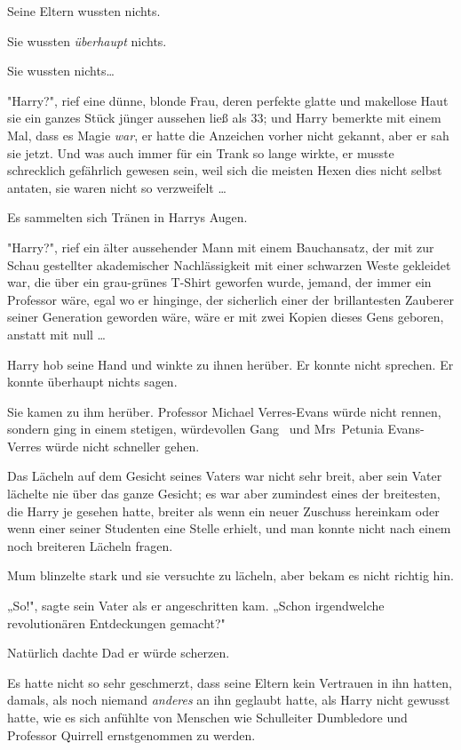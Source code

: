 {Seine Eltern wussten nichts.

Sie wussten \emph{überhaupt} nichts.

Sie wussten nichts…

"Harry?", rief eine dünne, blonde Frau, deren perfekte glatte und makellose Haut sie ein ganzes Stück jünger aussehen ließ als 33; und Harry bemerkte mit einem Mal, dass es Magie \emph{war}, er hatte die Anzeichen vorher nicht gekannt, aber er sah sie jetzt. Und was auch immer für ein Trank so lange wirkte, er musste schrecklich gefährlich gewesen sein, weil sich die meisten Hexen dies nicht selbst antaten, sie waren nicht so verzweifelt …

Es sammelten sich Tränen in Harrys Augen.

"Harry?", rief ein älter aussehender Mann mit einem Bauchansatz, der mit zur Schau gestellter akademischer Nachlässigkeit mit einer schwarzen Weste gekleidet war, die über ein grau-grünes T-Shirt geworfen wurde, jemand, der immer ein Professor wäre, egal wo er hinginge, der sicherlich einer der brillantesten Zauberer seiner Generation geworden wäre, wäre er mit zwei Kopien dieses Gens geboren, anstatt mit null …

Harry hob seine Hand und winkte zu ihnen herüber. Er konnte nicht sprechen. Er konnte überhaupt nichts sagen.

Sie kamen zu ihm herüber. Professor Michael Verres-Evans würde nicht rennen, sondern ging in einem stetigen, würdevollen Gang ~und Mrs~Petunia Evans-Verres würde nicht schneller gehen.

Das Lächeln auf dem Gesicht seines Vaters war nicht sehr breit, aber sein Vater lächelte nie über das ganze Gesicht; es war aber zumindest eines der breitesten, die Harry je gesehen hatte, breiter als wenn ein neuer Zuschuss hereinkam oder wenn einer seiner Studenten eine Stelle erhielt, und man konnte nicht nach einem noch breiteren Lächeln fragen.

Mum blinzelte stark und sie versuchte zu lächeln, aber bekam es nicht richtig hin.

„So!", sagte sein Vater als er angeschritten kam. „Schon irgendwelche revolutionären Entdeckungen gemacht?"

Natürlich dachte Dad er würde scherzen.

Es hatte nicht so sehr geschmerzt, dass seine Eltern kein Vertrauen in ihn hatten, damals, als noch niemand \emph{anderes} an ihn geglaubt hatte, als Harry nicht gewusst hatte, wie es sich anfühlte von Menschen wie Schulleiter Dumbledore und Professor Quirrell ernstgenommen zu werden.

}
